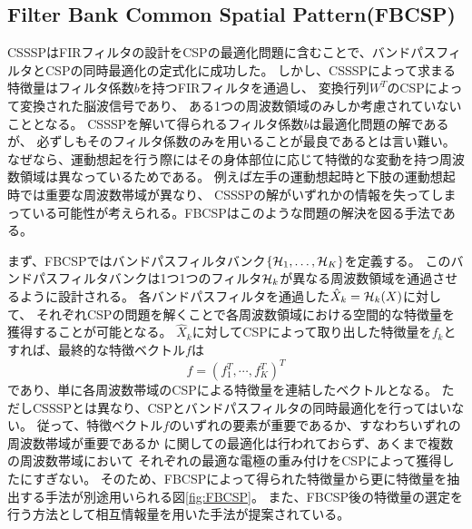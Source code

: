 \subsection{\rm Filter Bank Common Spatial Pattern(FBCSP)}
CSSSPはFIRフィルタの設計をCSPの最適化問題に含むことで、バンドパスフィルタとCSPの同時最適化の定式化に成功した。
しかし、CSSSPによって求まる特徴量はフィルタ係数\(b\)を持つFIRフィルタを通過し、
変換行列\(W^T\)のCSPによって変換された脳波信号であり、
ある1つの周波数領域のみしか考慮されていないこととなる。
CSSSPを解いて得られるフィルタ係数\(b\)は最適化問題の解であるが、
必ずしもそのフィルタ係数のみを用いることが最良であるとは言い難い。
なぜなら、運動想起を行う際にはその身体部位に応じて特徴的な変動を持つ周波数領域は異なっているためである。
例えば左手の運動想起時と下肢の運動想起時では重要な周波数帯域が異なり、
CSSSPの解がいずれかの情報を失ってしまっている可能性が考えられる。FBCSPはこのような問題の解決を図る手法である\cite{fbcsp}。

まず、FBCSPではバンドパスフィルタバンク\(\{ {\cal H}_1, \ldots, {\cal H}_K \}\)を定義する。
このバンドパスフィルタバンクは1つ1つのフィルタ\({\cal H}_k\)が異なる周波数領域を通過させるように設計される。
各バンドパスフィルタを通過した\(\hat X_k = {\cal H}_k(X)\)に対して、
それぞれCSPの問題を解くことで各周波数領域における空間的な特徴量を獲得することが可能となる。
\({\hat X}_k\)に対してCSPによって取り出した特徴量を\(f_k\)とすれば、最終的な特徴ベクトル\(f\)は
\begin{equation}
    f = (f_1^T,\cdots, f_K^T)^T
\end{equation}
であり、単に各周波数帯域のCSPによる特徴量を連結したベクトルとなる。
ただしCSSSPとは異なり、CSPとバンドパスフィルタの同時最適化を行ってはいない。
従って、特徴ベクトル\(f\)のいずれの要素が重要であるか、すなわちいずれの周波数帯域が重要であるか
に関しての最適化は行われておらず、あくまで複数の周波数帯域において
それぞれの最適な電極の重み付けをCSPによって獲得したにすぎない。
そのため、FBCSPによって得られた特徴量から更に特徴量を抽出する手法が別途用いられる図\ref{fig:FBCSP}。
また、FBCSP後の特徴量の選定を行う方法として相互情報量を用いた手法が提案されている\cite{fbcspBCICOMPE}。

